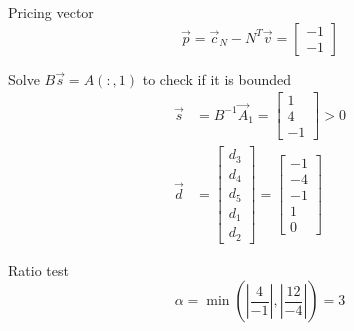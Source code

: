 \documentclass[a4paper,10pt]{article}
\begin{document}
\begin{enumerate}
\begin{enumerate}
{\begin{enumerate}
                    Pricing vector 
                    \[
                        \vec{p} = \vec{c}_N - N^T\vec{v} = \begin{bmatrix} -1 \\ -1 \end{bmatrix}
                    \]

                    Solve $B\vec{s}=A(:,1)$ to check if it is bounded
                    \begin{align}
                        \vec{s} &= B^{-1}\vec{A}_1 = \begin{bmatrix} 1 \\ 4 \\ -1 \end{bmatrix} > 0 \\
                        \vec{d} &= \begin{bmatrix} d_3 \\ d_4 \\ d_5 \\ d_1 \\ d_2 \end{bmatrix} = \begin{bmatrix} -1 \\ -4 \\ -1 \\ 1 \\ 0 \end{bmatrix}
                    \end{align}

                    Ratio test 
                    \[
                        \alpha = \min(|\frac{4}{-1}|, |\frac{12}{-4}|) = 3
                    \]


\end{enumerate}}
\end{enumerate}
\end{enumerate}
\end{document}
